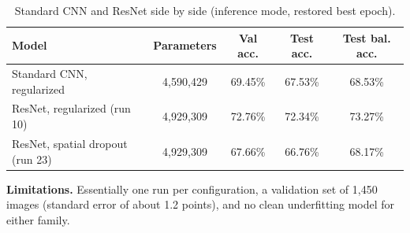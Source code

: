 \documentclass[11pt, a4paper]{article}
\begin{document}
\begin{table}[htbp]
\centering
\caption{Standard CNN and ResNet side by side (inference mode, restored best epoch).}
\label{tab:comparison}
\small
\begin{tabular}{@{}lcccc@{}}
\toprule
\textbf{Model} & \textbf{Parameters} & \textbf{Val acc.} & \textbf{Test acc.} & \textbf{Test bal. acc.} \\
\midrule
Standard CNN, regularized & 4,590,429 & 69.45\% & 67.53\% & 68.53\% \\
ResNet, regularized (run 10) & 4,929,309 & 72.76\% & 72.34\% & 73.27\% \\
ResNet, spatial dropout (run 23) & 4,929,309 & 67.66\% & 66.76\% & 68.17\% \\
\bottomrule
\end{tabular}
\end{table}

\textbf{Limitations.} Essentially one run per configuration, a validation set of 1,450 images (standard error of about 1.2 points), and no clean underfitting model for either family.
\end{document}
